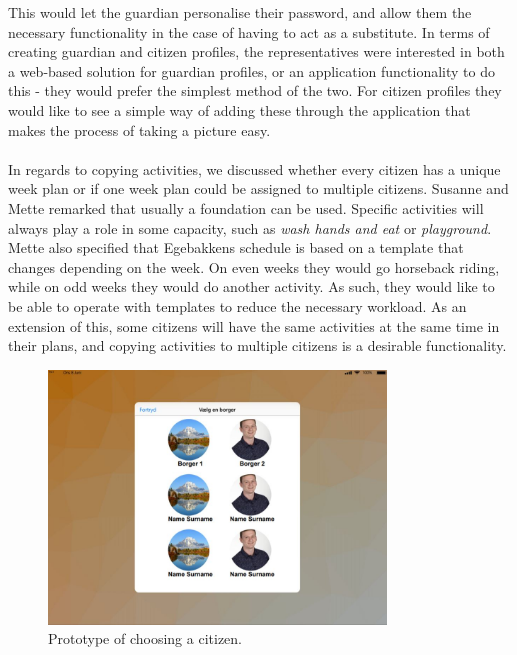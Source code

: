 This would let the guardian personalise their password, and allow them the necessary functionality in the case of having to act as a substitute.
In terms of creating guardian and citizen profiles, the representatives were interested in both a web-based solution for guardian profiles, or an application functionality to do this - they would prefer the simplest method of the two.
For citizen profiles they would like to see a simple way of adding these through the application that makes the process of taking a picture easy.
\\\\
In regards to copying activities, we discussed whether every citizen has a unique week plan or if one week plan could be assigned to multiple citizens.
Susanne and Mette remarked that usually a foundation can be used.
Specific activities will always play a role in some capacity, such as \textit{wash hands and eat} or \textit{playground}.
Mette also specified that Egebakkens schedule is based on a template that changes depending on the week.
On even weeks they would go horseback riding, while on odd weeks they would do another activity.
As such, they would like to be able to operate with templates to reduce the necessary workload.
As an extension of this, some citizens will have the same activities at the same time in their plans, and copying activities to multiple citizens is a desirable functionality.

\begin{figure}[!htb]
    \center
    \includegraphics[width=0.8\textwidth]{figures/select-citizen.JPG}
    \caption{\label{fig:choose-citizen-prototype} Prototype of choosing a citizen.}
\end{figure}

